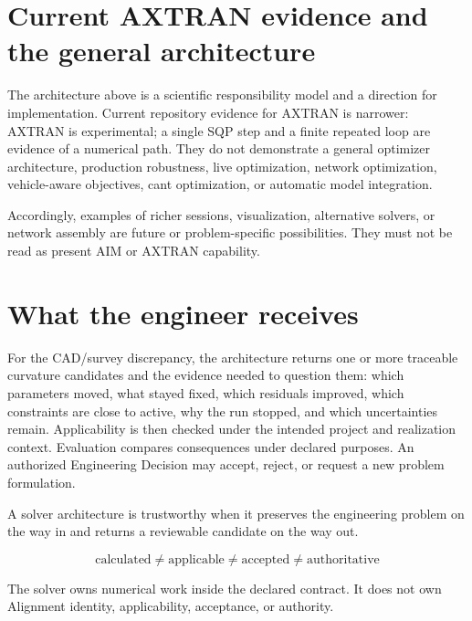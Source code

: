 \section{Current AXTRAN evidence and the general architecture}

The architecture above is a scientific responsibility model and a direction
for implementation. Current repository evidence for AXTRAN is narrower:
AXTRAN is experimental; a single SQP step and a finite repeated loop are
evidence of a numerical path. They do not demonstrate a general optimizer
architecture, production robustness, live optimization, network
optimization, vehicle-aware objectives, cant optimization, or automatic model
integration.

Accordingly, examples of richer sessions, visualization, alternative solvers,
or network assembly are future or problem-specific possibilities. They must
not be read as present AIM or AXTRAN capability.

\section{What the engineer receives}

For the CAD/survey discrepancy, the architecture returns one or more
traceable curvature candidates and the evidence needed to question them:
which parameters moved, what stayed fixed, which residuals improved, which
constraints are close to active, why the run stopped, and which uncertainties
remain. Applicability is then checked under the intended project and
realization context. Evaluation compares consequences under declared
purposes. An authorized Engineering Decision may accept, reject, or request a
new problem formulation.

\begin{summary}
A solver architecture is trustworthy when it preserves the engineering
problem on the way in and returns a reviewable candidate on the way out.

\[
\boxed{\text{calculated}\neq\text{applicable}\neq
\text{accepted}\neq\text{authoritative}}
\]

The solver owns numerical work inside the declared contract. It does not own
Alignment identity, applicability, acceptance, or authority.
\end{summary}
